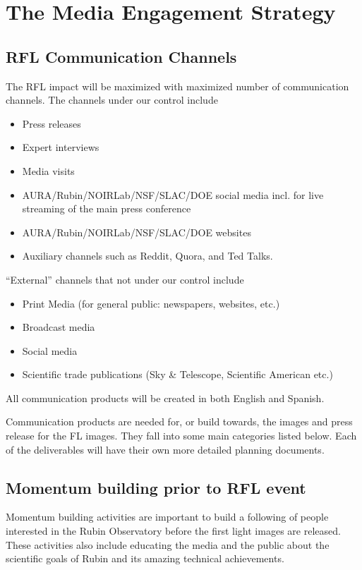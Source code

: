 \section{The Media Engagement Strategy}


\subsection{RFL Communication Channels}

The RFL impact will be maximized with maximized number of communication channels.
The channels under our control include
\begin{itemize}
\item Press releases
\item Expert interviews
\item Media visits 
\item AURA/Rubin/NOIRLab/NSF/SLAC/DOE social media incl. for live streaming of the main press conference
\item AURA/Rubin/NOIRLab/NSF/SLAC/DOE websites 
\item Auxiliary channels such as Reddit, Quora, and Ted Talks. 
\end{itemize} 

``External'' channels that not under our control include
\begin{itemize}
\item Print Media (for general public: newspapers, websites, etc.)
\item Broadcast media
\item Social media
\item Scientific trade publications (Sky \& Telescope, Scientific American etc.)
\end{itemize} 

All communication products will be created in both English and Spanish. 

Communication products are needed for, or build towards, the images and press release for the FL images.
They fall into some main categories listed below. Each of the deliverables will have their own more detailed planning documents. 


\subsection{Momentum building prior to RFL event}

Momentum building activities are important to build a following of people interested in the Rubin Observatory before the first light images are released. These activities also include educating the media and the public about the scientific goals of Rubin and its amazing technical achievements. 

